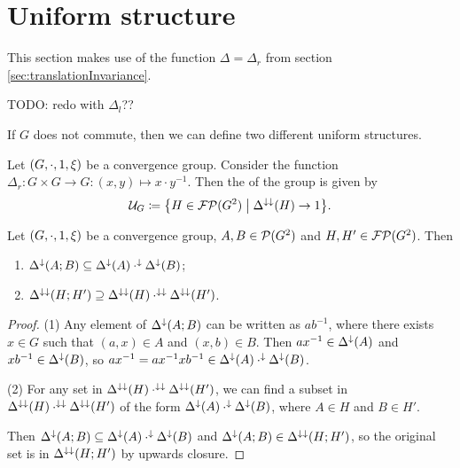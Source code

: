 \section{Uniform structure}
This section makes use of the function $\Delta = \Delta_r$ from section \ref{sec:translationInvariance}. \label{sec:groupUniformStructure}

TODO: redo with $\Delta_l$??

If $G$ does not commute, then we can define two different uniform structures.

\begin{definition}
Let $\left( G, \cdot, 1, \xi \right)$ be a convergence group. Consider the function $\Delta_r: G\times G\to G: (x,y) \mapsto x\cdot y^{-1}$. Then the  of the group is given by
\[ \mathcal{U}_G \defeq \setbuilder{H\in\powerfilters(G^2)}{\Delta^{\imf\imf}(H) \to 1}. \]
\end{definition}

\begin{lemma} \label{groupUniformityCompositionLemma}
Let $\left( G, \cdot, 1, \xi \right)$ be a convergence group, $A,B\in \operatorname{\mathcal{P}}(G^2)$ and $H,H'\in \operatorname{\mathcal{FP}}(G^2)$. Then
\begin{enumerate}
\item $\Delta^{\downarrow}(A;B) \subseteq \Delta^\downarrow(A)\cdot^\downarrow\Delta^\downarrow(B)$;
\item $\Delta^{\downarrow\downarrow}(H;H') \supseteq \Delta^{\downarrow\downarrow}(H) \cdot^{\downarrow\downarrow} \Delta^{\downarrow\downarrow}(H')$.
\end{enumerate}
\end{lemma}
\begin{proof}
(1) Any element of $\Delta^{\downarrow}(A;B)$ can be written as $ab^{-1}$, where there exists $x\in G$ such that $(a,x)\in A$ and $(x,b)\in B$. Then $ax^{-1}\in \Delta^\downarrow(A)$ and $xb^{-1}\in \Delta^\downarrow(B)$, so $ax^{-1} = ax^{-1}xb^{-1} \in \Delta^\downarrow(A)\cdot^\downarrow\Delta^\downarrow(B)$.

(2) For any set in $\Delta^{\downarrow\downarrow}(H) \cdot^{\downarrow\downarrow} \Delta^{\downarrow\downarrow}(H')$, we can find a subset in $\Delta^{\downarrow\downarrow}(H) \cdot^{\downarrow\downarrow} \Delta^{\downarrow\downarrow}(H')$ of the form $\Delta^\downarrow(A)\cdot^\downarrow\Delta^\downarrow(B)$, where $A\in H$ and $B\in H'$.

Then $\Delta^{\downarrow}(A;B) \subseteq \Delta^\downarrow(A)\cdot^\downarrow\Delta^\downarrow(B)$ and $\Delta^{\downarrow}(A;B) \in \Delta^{\downarrow\downarrow}(H;H')$, so the original set is in $\Delta^{\downarrow\downarrow}(H;H')$ by upwards closure.
\end{proof}

